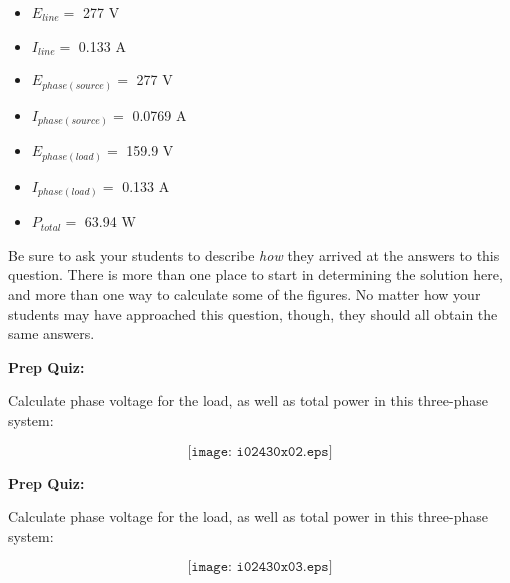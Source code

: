 





\begin{itemize}
\item{} $E_{line} =$ 277 V
\item{} $I_{line} =$ 0.133 A
\item{} $E_{phase(source)} =$ 277 V
\item{} $I_{phase(source)} =$ 0.0769 A
\item{} $E_{phase(load)} =$ 159.9 V
\item{} $I_{phase(load)} =$ 0.133 A
\item{} $P_{total} =$ 63.94 W
\end{itemize}

Be sure to ask your students to describe {\it how} they arrived at the answers to this question.  There is more than one place to start in determining the solution here, and more than one way to calculate some of the figures.  No matter how your students may have approached this question, though, they should all obtain the same answers.

\vfil \eject

\noindent
{\bf Prep Quiz:}

Calculate phase voltage for the load, as well as total power in this three-phase system:

$$\texttt{[image: i02430x02.eps]}$$


\vfil \eject

\noindent
{\bf Prep Quiz:}

Calculate phase voltage for the load, as well as total power in this three-phase system:

$$\texttt{[image: i02430x03.eps]}$$







